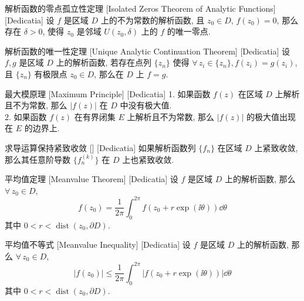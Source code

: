         \begin{thm}
            {解析函数的零点孤立性定理}
            [Isolated Zeros Theorem of Analytic Functions]
            [Dedicatia]
            设 $f$ 是区域 $D$ 上的不为常数的解析函数, 且 $z_0\in D$, $f(z_0)=0$, 那么存在 $\delta>0$, 使得 $z_0$ 是邻域 $U(z_0,\delta)$ 上的 $f$ 的唯一零点.
        \end{thm}

        \begin{thm}
            {解析函数的唯一性定理}
            [Unique Analytic Continuation Theorem]
            [Dedicatia]
            设 $f,g$ 是区域 $D$ 上的解析函数, 若存在点列 $\{z_n\}$ 使得 $\forall\,z_i\in\{z_n\}, f(z_i)=g(z_i)$, 且 $\{z_n\}$ 有极限点 $z_0\in D$, 那么在 $D$ 上 $f=g$.
        \end{thm}
        
        \begin{thm}
            {最大模原理}
            [Maximum Principle]
            [Dedicatia]
            1. 如果函数 \(f(z)\) 在区域 \(D\) 上解析且不为常数, 那么 \(|f(z)|\) 在 \(D\) 中没有极大值. \\
            2. 如果函数 \(f(z)\) 在有界闭集 \(E\) 上解析且不为常数, 那么 \(|f(z)|\) 的极大值出现在 \(E\) 的边界上. 
        \end{thm}

        \begin{crl}
            {求导运算保持紧致收敛}
            []
            [Dedicatia]
            如果解析函数列 $\{f_n\}$ 在区域 $D$ 上紧致收敛, 那么其任意阶导数 $\{f_n^{(k)}\}$ 在 $D$ 上也紧致收敛.
        \end{crl}

        \begin{thm}
            [Meanvalue]
            {平均值定理}
            [Meanvalue Theorem]
            [Dedicatia]
            设 $f$ 是区域 $D$ 上的解析函数, 那么 $\forall\,z_0\in D$, 
            \[f(z_0)=\frac{1}{2\pi}\int_0^{2\pi}f(z_0+r\exp(\ii\theta))\dd{\theta}\]
            其中 $0<r<\operatorname{dist}(z_0,\partial D)$.
        \end{thm}

        \begin{thm}
            {平均值不等式}
            [Meanvalue Inequality]
            [Dedicatia]
            设 $f$ 是区域 $D$ 上的解析函数, 那么 $\forall\,z_0\in D$, 
            \[|f(z_0)|\leq\frac{1}{2\pi}\int_0^{2\pi}|f(z_0+r\exp(\ii\theta))|\dd{\theta}\]
            其中 $0<r<\operatorname{dist}(z_0,\partial D)$.
        \end{thm}

